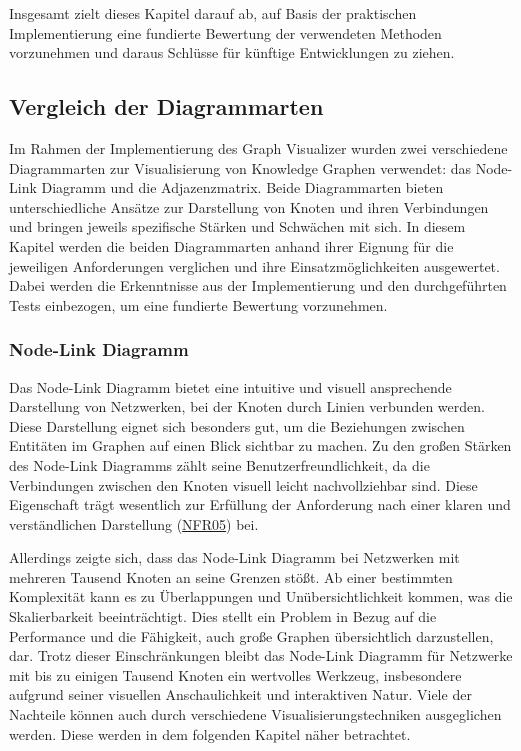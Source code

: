 Insgesamt zielt dieses Kapitel darauf ab, auf Basis der praktischen Implementierung eine fundierte Bewertung der verwendeten Methoden vorzunehmen und daraus Schlüsse für künftige Entwicklungen zu ziehen.

\subsection{Vergleich der Diagrammarten}

Im Rahmen der Implementierung des Graph Visualizer wurden zwei verschiedene Diagrammarten zur Visualisierung von Knowledge Graphen verwendet: das Node-Link Diagramm und die Adjazenzmatrix. Beide Diagrammarten bieten unterschiedliche Ansätze zur Darstellung von Knoten und ihren Verbindungen und bringen jeweils spezifische Stärken und Schwächen mit sich. In diesem Kapitel werden die beiden Diagrammarten anhand ihrer Eignung für die jeweiligen Anforderungen verglichen und ihre Einsatzmöglichkeiten ausgewertet. Dabei werden die Erkenntnisse aus der Implementierung und den durchgeführten Tests einbezogen, um eine fundierte Bewertung vorzunehmen.

\subsubsection{Node-Link Diagramm}

Das Node-Link Diagramm bietet eine intuitive und visuell ansprechende Darstellung von Netzwerken, bei der Knoten durch Linien verbunden werden. Diese Darstellung eignet sich besonders gut, um die Beziehungen zwischen Entitäten im Graphen auf einen Blick sichtbar zu machen. Zu den großen Stärken des Node-Link Diagramms zählt seine Benutzerfreundlichkeit, da die Verbindungen zwischen den Knoten visuell leicht nachvollziehbar sind. Diese Eigenschaft trägt wesentlich zur Erfüllung der Anforderung nach einer klaren und verständlichen Darstellung (\hyperref[NFR05]{NFR05}) bei.

Allerdings zeigte sich, dass das Node-Link Diagramm bei Netzwerken mit mehreren Tausend Knoten an seine Grenzen stößt. Ab einer bestimmten Komplexität kann es zu Überlappungen und Unübersichtlichkeit kommen, was die Skalierbarkeit beeinträchtigt. Dies stellt ein Problem in Bezug auf die Performance und die Fähigkeit, auch große Graphen übersichtlich darzustellen, dar. Trotz dieser Einschränkungen bleibt das Node-Link Diagramm für Netzwerke mit bis zu einigen Tausend Knoten ein wertvolles Werkzeug, insbesondere aufgrund seiner visuellen Anschaulichkeit und interaktiven Natur. Viele der Nachteile können auch durch verschiedene Visualisierungstechniken ausgeglichen werden. Diese werden in dem folgenden Kapitel näher betrachtet.

